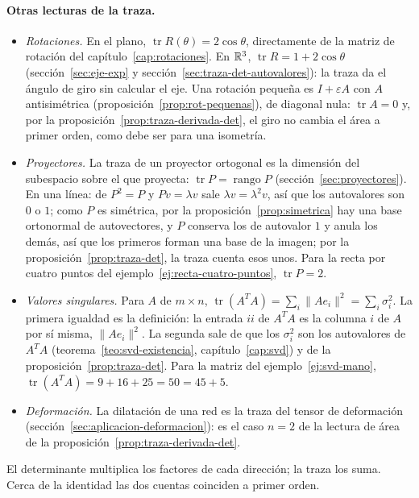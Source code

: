 \paragraph{Otras lecturas de la traza.}
\begin{itemize}
\item \emph{Rotaciones.} En el plano,
\(\operatorname{tr}R(\theta)=2\cos\theta\), directamente de la matriz de rotación del
capítulo~\ref{cap:rotaciones}. En \(\mathbb{R}^3\), \(\operatorname{tr}R=1+2\cos\theta\)
(sección~\ref{sec:eje-exp} y sección~\ref{sec:traza-det-autovalores}): la traza da el
ángulo de giro sin calcular el eje. Una rotación pequeña es \(I+\varepsilon A\) con \(A\)
antisimétrica (proposición~\ref{prop:rot-pequenas}), de diagonal nula: \(\operatorname{tr}A=0\)
y, por la proposición~\ref{prop:traza-derivada-det}, el giro no cambia el área a primer
orden, como debe ser para una isometría.
\item \emph{Proyectores.} La traza de un proyector ortogonal es la dimensión del subespacio
sobre el que proyecta: \(\operatorname{tr}P=\operatorname{rango}P\)
(sección~\ref{sec:proyectores}). En una línea: de \(P^2=P\) y \(Pv=\lambda v\) sale
\(\lambda v=\lambda^2v\), así que los autovalores son \(0\) o \(1\); como \(P\) es
simétrica, por la proposición~\ref{prop:simetrica} hay una base ortonormal de autovectores,
y \(P\) conserva los de autovalor \(1\) y anula los demás, así que los primeros forman una base de la imagen; por la proposición~\ref{prop:traza-det}, la
traza cuenta esos unos. Para la recta por cuatro puntos del
ejemplo~\ref{ej:recta-cuatro-puntos}, \(\operatorname{tr}P=2\).
\item \emph{Valores singulares.} Para \(A\) de \(m\times n\),
\(\operatorname{tr}(A^TA)=\sum_i\lVert Ae_i\rVert^2=\sum_i\sigma_i^2\). La primera igualdad
es la definición: la entrada \(ii\) de \(A^TA\) es la columna \(i\) de \(A\) por sí misma,
\(\lVert Ae_i\rVert^2\). La segunda sale de que los \(\sigma_i^2\) son los autovalores de
\(A^TA\) (teorema~\ref{teo:svd-existencia}, capítulo~\ref{cap:svd}) y de la
proposición~\ref{prop:traza-det}. Para la matriz del ejemplo~\ref{ej:svd-mano},
\(\operatorname{tr}(A^TA)=9+16+25=50=45+5\).
\item \emph{Deformación.} La dilatación de una red es la traza del tensor de deformación
(sección~\ref{sec:aplicacion-deformacion}): es el caso \(n=2\) de la lectura de área de la
proposición~\ref{prop:traza-derivada-det}.
\end{itemize}

\begin{idea}
El determinante multiplica los factores de cada dirección; la traza los suma. Cerca de la
identidad las dos cuentas coinciden a primer orden.
\end{idea}

